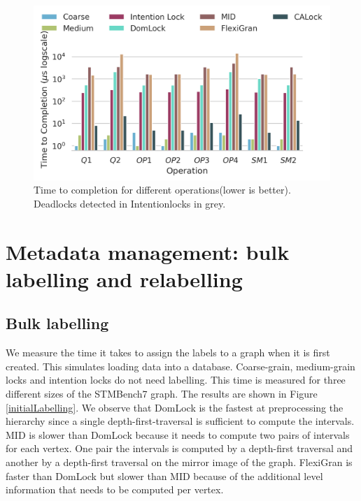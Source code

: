 
\begin{figure}
	\captionsetup{justification=centering}
	\centering
	\includegraphics[width=\columnwidth]{figures/PerformanceCharts/TTC}
	\caption{Time to completion for different operations(lower is better). Deadlocks detected in Intentionlocks in grey.}
	\label{ttc}
\end{figure}


\section{Metadata management: bulk labelling and relabelling} \label
{benchmark:labellingAndRelabelling}
\subsection{Bulk labelling}

We measure the time it takes to assign the labels to a graph when it is first created. 
This simulates loading data into a database.
Coarse-grain, medium-grain locks and intention locks do not need labelling. 
This time is measured for three different sizes of the STMBench7 graph. 
The results are shown in Figure \ref{initialLabelling}. 
We observe that DomLock is the fastest at preprocessing the hierarchy since a single depth-first-traversal is sufficient to compute the intervals. MID is slower than DomLock because it needs to compute two pairs of intervals for each vertex. One pair the intervals is computed by a depth-first traversal and another by a depth-first traversal on the mirror image of the graph. FlexiGran is faster than DomLock but slower than MID because of the additional level information that needs to be computed per vertex. 


